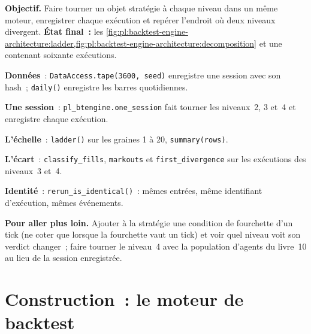 \begin{tutorial}
\textbf{Objectif.} Faire tourner un objet stratégie à chaque niveau dans un même moteur, enregistrer chaque exécution et repérer l'endroit où deux niveaux divergent.
\textbf{État final~:} les \cref{fig:pl:backtest-engine-architecture:ladder,fig:pl:backtest-engine-architecture:decomposition} et une 
contenant soixante exécutions.
\begin{tutsteps}
\item \textbf{Données}~: \texttt{DataAccess.tape(3600, seed)} enregistre une session avec son hash~; \texttt{daily()} enregistre les barres quotidiennes.
\item \textbf{Une session}~: \texttt{pl\_btengine.one\_session} fait tourner les niveaux~2, 3 et~4 et enregistre chaque exécution.
\item \textbf{L'échelle}~: \texttt{ladder()} sur les graines 1 à 20, \texttt{summary(rows)}.
\item \textbf{L'écart}~: \texttt{classify\_fills}, \texttt{markouts} et \texttt{first\_divergence} sur les exécutions des niveaux~3 et~4.
\item \textbf{Identité}~: \texttt{rerun\_is\_identical()}~: mêmes entrées, même identifiant d'exécution, mêmes événements.
\end{tutsteps}
\textbf{Pour aller plus loin.} Ajouter à la stratégie une condition de fourchette d'un tick (ne coter que lorsque la fourchette vaut un tick) et voir quel
niveau voit son verdict changer~; faire tourner le niveau~4 avec la population d'agents du livre~10 au lieu de la session enregistrée.
\end{tutorial}

\section{Construction~: le moteur de backtest}\label{bld:pl:backtest-engine-architecture:btengine}

